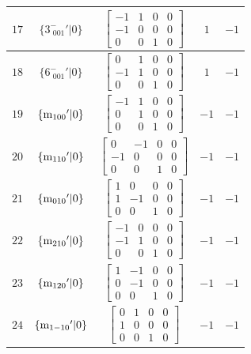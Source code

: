\documentclass[fleqn,8pt]{jsarticle}
\begin{document}
\begin{longtable}{ccccc}
$ 17 $ & $ \{3^{-}_{\,\,001}{}'|0\} $ & $ \begin{bmatrix} -1 & 1 & 0 & 0 \\ -1 & 0 & 0 & 0 \\ 0 & 0 & 1 & 0 \end{bmatrix} $ & $ 1 $ & $ -1 $ \\ \hline
$ 18 $ & $ \{6^{-}_{\,\,001}{}'|0\} $ & $ \begin{bmatrix} 0 & 1 & 0 & 0 \\ -1 & 1 & 0 & 0 \\ 0 & 0 & 1 & 0 \end{bmatrix} $ & $ 1 $ & $ -1 $ \\ \hline
$ 19 $ & $ \{{\rm m}_{100}{}'|0\} $ & $ \begin{bmatrix} -1 & 1 & 0 & 0 \\ 0 & 1 & 0 & 0 \\ 0 & 0 & 1 & 0 \end{bmatrix} $ & $ -1 $ & $ -1 $ \\ \hline
$ 20 $ & $ \{{\rm m}_{110}{}'|0\} $ & $ \begin{bmatrix} 0 & -1 & 0 & 0 \\ -1 & 0 & 0 & 0 \\ 0 & 0 & 1 & 0 \end{bmatrix} $ & $ -1 $ & $ -1 $ \\ \hline
$ 21 $ & $ \{{\rm m}_{010}{}'|0\} $ & $ \begin{bmatrix} 1 & 0 & 0 & 0 \\ 1 & -1 & 0 & 0 \\ 0 & 0 & 1 & 0 \end{bmatrix} $ & $ -1 $ & $ -1 $ \\ \hline
$ 22 $ & $ \{{\rm m}_{210}{}'|0\} $ & $ \begin{bmatrix} -1 & 0 & 0 & 0 \\ -1 & 1 & 0 & 0 \\ 0 & 0 & 1 & 0 \end{bmatrix} $ & $ -1 $ & $ -1 $ \\ \hline
$ 23 $ & $ \{{\rm m}_{120}{}'|0\} $ & $ \begin{bmatrix} 1 & -1 & 0 & 0 \\ 0 & -1 & 0 & 0 \\ 0 & 0 & 1 & 0 \end{bmatrix} $ & $ -1 $ & $ -1 $ \\ \hline
$ 24 $ & $ \{{\rm m}_{1-10}{}'|0\} $ & $ \begin{bmatrix} 0 & 1 & 0 & 0 \\ 1 & 0 & 0 & 0 \\ 0 & 0 & 1 & 0 \end{bmatrix} $ & $ -1 $ & $ -1 $ \\
\end{longtable}
\end{document}
